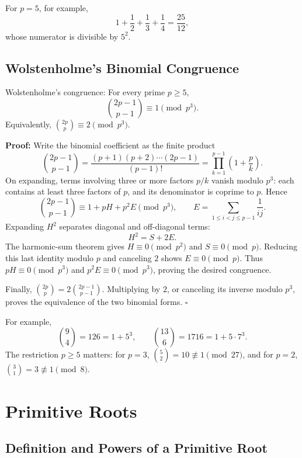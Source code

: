 \documentclass[a4paper,11pt,abstracton]{scrartcl}
\theoremstyle{dotlessP}
\theoremstyle{dotlessS}
\theoremstyle{remark}
\theoremstyle{definition}
\begin{document}
\begin{example_box}
For $p=5$, for example,
\[
    1+\frac12+\frac13+\frac14=\frac{25}{12},
\]
whose numerator is divisible by $5^2$.
\end{example_box}


\subsection{Wolstenholme's Binomial Congruence}

\begin{mainbox}{Wolstenholme's congruence:}
For every prime $p\geq5$,
\[
    \boxed{\binom{2p-1}{p-1}\equiv1\pmod{p^3}.}
\]
Equivalently, $\binom{2p}{p}\equiv2\pmod{p^3}$.
\end{mainbox}

\textbf{Proof:}
Write the binomial coefficient as the finite product
\[
    \binom{2p-1}{p-1}
      =\frac{(p+1)(p+2)\cdots(2p-1)}{(p-1)!}
      =\prod_{k=1}^{p-1}\left(1+\frac pk\right).
\]
On expanding, terms involving three or more factors $p/k$ vanish
modulo $p^3$: each contains at least three factors of $p$, and its
denominator is coprime to $p$. Hence
\[
    \binom{2p-1}{p-1}
    \equiv1+pH+p^2 E\pmod{p^3},\qquad
    E=\sum_{1\leq i<j\leq p-1}\frac1{ij}.
\]
Expanding $H^2$ separates diagonal and off-diagonal terms:
\[
    H^2=S+2E.
\]
The harmonic-sum theorem gives $H\equiv0\pmod{p^2}$ and
$S\equiv0\pmod p$. Reducing this last identity modulo $p$ and
canceling $2$ shows $E\equiv0\pmod p$.
Thus $pH\equiv0\pmod{p^3}$ and $p^2E\equiv0\pmod{p^3}$, proving
the desired congruence.

Finally, $\binom{2p}{p}=2\binom{2p-1}{p-1}$.
Multiplying by $2$, or canceling its inverse modulo $p^3$, proves
the equivalence of the two binomial forms.
\hfill$\square$



\begin{example_box}
For example,
\[
    \binom94=126=1+5^3,\qquad
    \binom{13}{6}=1716=1+5\cdot7^3.
\]
The restriction $p\geq5$ matters: for $p=3$,
$\binom52=10\not\equiv1\pmod{27}$, and for $p=2$,
$\binom31=3\not\equiv1\pmod8$.
\end{example_box}


\section{Primitive Roots}

\subsection{Definition and Powers of a Primitive Root}
\end{document}

